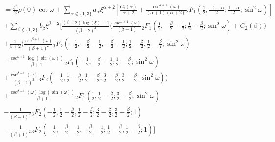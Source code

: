 \documentclass{article}
\begin{document}
\begin{align}
    = \frac{\xi^2}{2}\rho(0)\cot \omega + \sum_{\alpha \notin \{1,3\}} a_{\alpha}\xi^{\alpha+2}\left[\frac{C_2(\alpha)}{\alpha+2} + \frac{\csc^{\alpha+1}(\omega)}{(\alpha+1)(\alpha+2)}{_2}F_1\left(\frac{1}{2}, \frac{-1-\alpha}{2}; \frac{1-\alpha}{2}; \sin^2 \omega\right)\right] \nonumber \\
    + \sum_{\beta \notin \{1,3\}}b_\beta\xi^{\beta+2} \Bigg[\frac{(\beta+2)\log(\xi) - 1}{(\beta+2)^2}\Bigg(\frac{\csc^{\beta+1}(\omega)}{(\beta+1)}{_2}F_1\left(\frac{1}{2}, -\frac{\beta}{2}-\frac{1}{2}; \frac{1}{2}-\frac{\beta}{2}; \sin^2 \omega\right) + C_2(\beta)\Bigg)
    \nonumber \\
    + \frac{1}{\beta+2}\Bigg( \frac{\csc^{\beta +1}(\omega)}{(\beta+1)^2}{_3}F_2\left(-\frac{1}{2}, -\frac{\beta}{2}-\frac{1}{2}, -\frac{\beta}{2}-\frac{1}{2}; \frac{1}{2}-\frac{\beta}{2}, \frac{1}{2}-\frac{\beta}{2}; \sin^2 \omega\right) \nonumber \\
    - \frac{\csc^{\beta+1}\log(\sin(\omega))}{\beta+1}{_2}F_1\left(-\frac{1}{2}, -\frac{\beta}{2}-\frac{1}{2}; \frac{1}{2}-\frac{\beta}{2}; \sin^2 \omega\right) \nonumber \\
    + \frac{\csc^{\beta-1}(\omega)}{(\beta-1)^2}{_3}F_2\left(-\frac{1}{2}, \frac{1}{2}-\frac{\beta}{2}, \frac{1}{2}-\frac{\beta}{2}; \frac{3}{2}-\frac{\beta}{2}, \frac{3}{2}-\frac{\beta}{2}; \sin^2 \omega\right)\Bigg)
    \nonumber \\ 
    + \frac{\csc^{\beta-1}(\omega)\log(\sin(\omega))}{\beta+1}{_2}F_1\left(\frac{1}{2}, \frac{1}{2}-\frac{\beta}{2}; \frac{3}{2}-\frac{\beta}{2}; \sin^2 \omega \right) \nonumber \\
    -\frac{1}{(\beta-1)^2}{_3}F_2\left(-\frac{1}{2}, \frac{1}{2}-\frac{\beta}{2}, \frac{1}{2}-\frac{\beta}{2}; \frac{3}{2}-\frac{\beta}{2}, \frac{3}{2}-\frac{\beta}{2}; 1\right) \nonumber \\
    - \frac{1}{(\beta+1)^2}{_3}F_2\left(-\frac{1}{2}, -\frac{\beta}{2}-\frac{1}{2}, -\frac{\beta}{2}-\frac{1}{2}; \frac{1}{2}-\frac{\beta}{2}, \frac{1}{2}-\frac{\beta}{2}; 1\right) \Bigg] \nonumber \\ 

\end{align}
\end{document}
